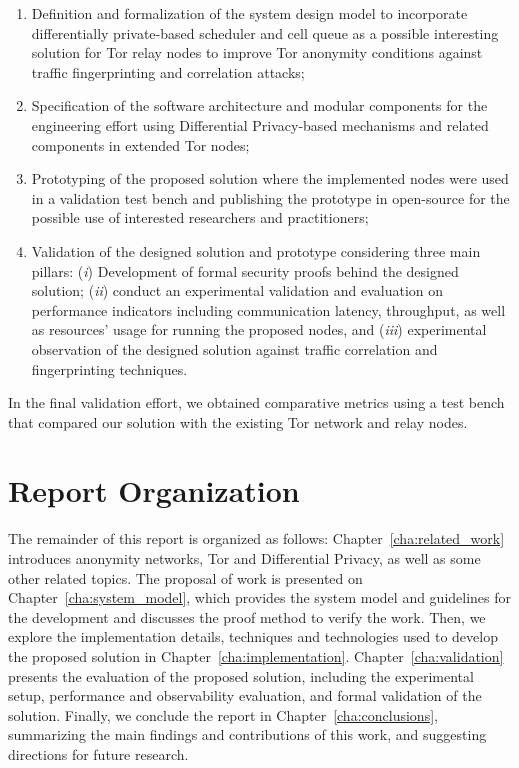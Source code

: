 \begin{enumerate}
    \item Definition and formalization of the system design model to incorporate differentially private-based scheduler and cell queue as a possible interesting solution for Tor relay nodes to improve Tor anonymity conditions against traffic fingerprinting and correlation attacks;

    \item Specification of the software architecture and modular components for the engineering effort using Differential Privacy-based mechanisms and related components in extended Tor nodes;
   
    \item Prototyping of the proposed solution where the implemented nodes were used in a validation test bench and publishing the prototype in open-source for the possible use of interested researchers and practitioners;
   
    \item Validation of the designed solution and prototype considering three main pillars: (\emph{i}) Development of formal security proofs behind the designed solution; (\emph{ii}) conduct an experimental validation and evaluation on performance indicators including communication latency, throughput, as well as resources' usage for running the proposed nodes, and (\emph{iii}) experimental observation of the designed solution against traffic correlation and fingerprinting techniques. 
   
\end{enumerate}

In the final validation effort, we obtained comparative metrics using a test bench that compared our solution with the existing Tor network and relay nodes.


\section{Report Organization}\label{sec:report_organization}
The remainder of this report is organized as follows: Chapter~\ref{cha:related_work} introduces anonymity networks, Tor and Differential Privacy, as well as some other related topics. The proposal of work is presented on Chapter~\ref{cha:system_model}, which provides the system model and guidelines for the development and discusses the proof method to verify the work. Then, we explore the implementation details, techniques and technologies used to develop the proposed solution in Chapter~\ref{cha:implementation}. Chapter~\ref{cha:validation} presents the evaluation of the proposed solution, including the experimental setup, performance and observability evaluation, and formal validation of the solution. Finally, we conclude the report in Chapter~\ref{cha:conclusions}, summarizing the main findings and contributions of this work, and suggesting directions for future research.